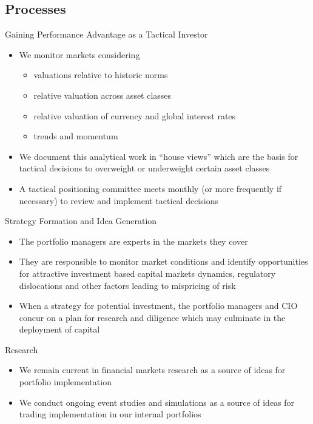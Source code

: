 \documentclass[10pt,english]{beamer}\usepackage[]{graphicx}\usepackage[]{color}
\begin{document}
\subsection{Processes}
\begin{frame}{Gaining Performance Advantage as a Tactical Investor}

\begin{itemize}
\item We monitor markets considering
\begin{itemize}
\item valuations relative to historic norms
\item relative valuation across asset classes
\item relative valuation of currency and global interest rates
\item trends and momentum
\end{itemize}
\item We document this analytical work in ``house views'' which are the
basis for tactical decisions to overweight or underweight certain
asset classes
\item A tactical positioning committee meets monthly (or more frequently
if necessary) to review and implement tactical decisions
\end{itemize}
\end{frame}
%
\begin{frame}{Strategy Formation and Idea Generation}

\begin{itemize}
\item The portfolio managers are experts in the markets they cover
\item They are responsible to monitor market conditions and identify opportunities
for attractive investment based capital markets dynamics, regulatory
dislocations and other factors leading to mispricing of risk
\item When a strategy for potential investment, the portfolio managers and
CIO concur on a plan for research and diligence which may culminate
in the deployment of capital 
\end{itemize}
\end{frame}
%
\begin{frame}{Research}
\begin{itemize}
\item We remain current in financial markets research as a source of ideas
for portfolio implementation
\item We conduct ongoing event studies and simulations as a source of ideas
for trading implementation in our internal portfolios
\end{itemize}
\end{frame}
\end{document}
